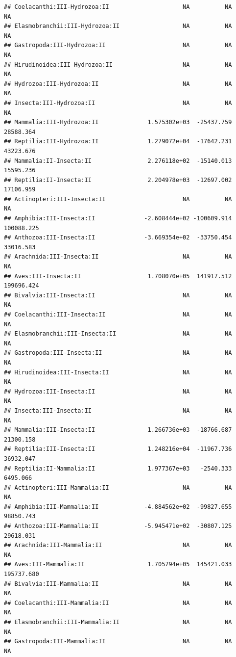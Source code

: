 \documentclass[
  12pt,
]{article}
\begin{document}
\begin{verbatim}
## Coelacanthi:III-Hydrozoa:II                     NA          NA          NA
## Elasmobranchii:III-Hydrozoa:II                  NA          NA          NA
## Gastropoda:III-Hydrozoa:II                      NA          NA          NA
## Hirudinoidea:III-Hydrozoa:II                    NA          NA          NA
## Hydrozoa:III-Hydrozoa:II                        NA          NA          NA
## Insecta:III-Hydrozoa:II                         NA          NA          NA
## Mammalia:III-Hydrozoa:II              1.575302e+03  -25437.759   28588.364
## Reptilia:III-Hydrozoa:II              1.279072e+04  -17642.231   43223.676
## Mammalia:II-Insecta:II                2.276118e+02  -15140.013   15595.236
## Reptilia:II-Insecta:II                2.204978e+03  -12697.002   17106.959
## Actinopteri:III-Insecta:II                      NA          NA          NA
## Amphibia:III-Insecta:II              -2.608444e+02 -100609.914  100088.225
## Anthozoa:III-Insecta:II              -3.669354e+02  -33750.454   33016.583
## Arachnida:III-Insecta:II                        NA          NA          NA
## Aves:III-Insecta:II                   1.708070e+05  141917.512  199696.424
## Bivalvia:III-Insecta:II                         NA          NA          NA
## Coelacanthi:III-Insecta:II                      NA          NA          NA
## Elasmobranchii:III-Insecta:II                   NA          NA          NA
## Gastropoda:III-Insecta:II                       NA          NA          NA
## Hirudinoidea:III-Insecta:II                     NA          NA          NA
## Hydrozoa:III-Insecta:II                         NA          NA          NA
## Insecta:III-Insecta:II                          NA          NA          NA
## Mammalia:III-Insecta:II               1.266736e+03  -18766.687   21300.158
## Reptilia:III-Insecta:II               1.248216e+04  -11967.736   36932.047
## Reptilia:II-Mammalia:II               1.977367e+03   -2540.333    6495.066
## Actinopteri:III-Mammalia:II                     NA          NA          NA
## Amphibia:III-Mammalia:II             -4.884562e+02  -99827.655   98850.743
## Anthozoa:III-Mammalia:II             -5.945471e+02  -30807.125   29618.031
## Arachnida:III-Mammalia:II                       NA          NA          NA
## Aves:III-Mammalia:II                  1.705794e+05  145421.033  195737.680
## Bivalvia:III-Mammalia:II                        NA          NA          NA
## Coelacanthi:III-Mammalia:II                     NA          NA          NA
## Elasmobranchii:III-Mammalia:II                  NA          NA          NA
## Gastropoda:III-Mammalia:II                      NA          NA          NA

\end{verbatim}
\end{document}
